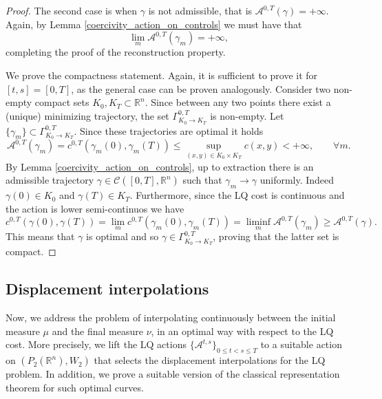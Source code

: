 \documentclass[reqno]{amsart}
\theoremstyle{plain}
\theoremstyle{definition}
\theoremstyle{remark}
\newcommand{\R}{\mathbb{R}}
\begin{document}
\begin{proof}
		The second case is when $\gamma$ is not admissible, that is $\mathcal{A}^{0,T}(\gamma)=+\infty$. Again, by Lemma \ref{coercivity_action_on_controls} we must have that
        \begin{equation}
            \lim_m \mathcal{A}^{0,T}(\gamma_m) =  +\infty,
        \end{equation}
		completing the proof of the reconstruction property.

        We prove the compactness statement. Again, it is sufficient to prove it for $[t,s]=[0,T]$, as the general case can be proven analogously. Consider two non-empty compact sets $K_0,K_T\subset\mathbb{R}^n$. Since between any two points there exist a (unique) minimizing trajectory, the set $\Gamma^{0,T}_{K_0\to K_T}$ is non-empty. Let $\{\gamma_m\}\subset\Gamma^{0,T}_{K_0\to K_T}$. Since these trajectories are optimal it holds
        \begin{equation}
            \mathcal{A}^{0,T}(\gamma_m) = c^{0,T}(\gamma_m(0),\gamma_m(T))\leq \sup_{(x,y)\in K_0\times K_T} c(x,y) < +\infty, \qquad \forall m.
        \end{equation}
        By Lemma \ref{coercivity_action_on_controls}, up to extraction there is an admissible trajectory $\gamma \in \mathcal{C}([0,T],\R^n)$ such that $\gamma_m \to \gamma$ uniformly. Indeed $\gamma(0)\in K_0$ and $\gamma(T)\in K_T$. Furthermore, since the LQ cost is continuous and the action is lower semi-continuos we have
        \begin{equation}
         c^{0,T}(\gamma(0),\gamma(T)) = \lim_m c^{0,T}(\gamma_m(0),\gamma_m(T)) = \liminf_{m}\mathcal{A}^{0,T}(\gamma_m) \geq \mathcal{A}^{0,T}(\gamma).
        \end{equation}
        This means that $\gamma$ is optimal and so $\gamma\in \Gamma^{0,T}_{K_0\to K_T}$, proving that the latter set is compact.
	\end{proof}
\subsection{Displacement interpolations}   

Now, we address the problem of interpolating continuously between the initial measure $\mu$ and the final measure $\nu$, in an optimal way with respect to the LQ cost. More precisely, we lift the LQ actions $\{\mathcal{A}^{t,s}\}_{0\leq t<s\leq T}$ to a suitable action on $(P_2(\mathbb{R}^n),W_2)$ that selects the displacement interpolations for the LQ problem. In addition, we prove a suitable version of the classical representation theorem for such optimal curves.
\end{document}
